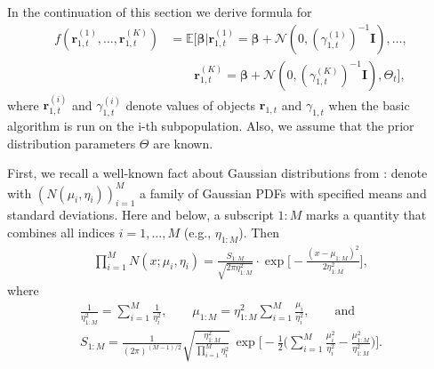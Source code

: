 In the continuation of this section we derive formula for 
\begin{equation}
\label{new_denoiser}
\begin{split}
f(\textbf{r}_{1,t}^{(1)}, \dots, \textbf{r}_{1,t}^{(K)}) & = \mathbb{E}[\bm{\beta} | \bm{r}_{1,t}^{(1)} = \bm{\beta} + \mathcal{N}(0, (\gamma_{1,t}^{(1)})^{-1}\bm{I}), \dots, \\
& \qquad \bm{r}_{1,t}^{(K)} = \bm{\beta} + \mathcal{N}(0, (\gamma_{1,t}^{(K)})^{-1}\bm{I}), \Theta_{t}],
\end{split}
\end{equation}
where $\bm{r}_{1,t}^{(i)}$ and $\gamma_{1,t}^{(i)}$ denote values of objects $\bm{r}_{1,t}$ and $\gamma_{1,t}$ when the basic algorithm is run on the i-th subpopulation. Also, we assume that the prior distribution parameters $\Theta$ are known.

First, we recall a well-known fact about Gaussian distributions from \cite{bromiley_products_2013}: denote with $(N(\mu_i, \eta_i))_{i=1}^M$ a family of Gaussian PDFs with specified means and standard deviations. Here and below, a subscript $1{:}M$ marks a quantity that combines all indices $i=1,\dots,M$ (e.g., $\eta_{1:M}$). Then
\begin{align}
    \label{prod_gaussians_PDFs}
    \prod_{i=1}^M N(x;\mu_i, \eta_i) = \frac{S_{1:M}}{\sqrt{2 \pi \eta^2_{1:M}}} \cdot \exp \bigg [ - \frac{(x-\mu_{1:M})^2}{2 \eta_{1:M}^2}\bigg ],
\end{align}
where 
\begin{gather}
    \frac{1}{\eta^2_{1:M}} = \sum_{i=1}^M \frac{1}{\eta^2_i}, \qquad \mu_{1:M} = \eta^2_{1:M} \sum_{i=1}^M \frac{\mu_i}{\eta_i^2}, \qquad \text{and} \nonumber \\
    S_{1:M} = \frac{1}{(2\pi)^{(M-1)/2}} \sqrt{\frac{\eta^2_{1:M}}{\prod_{i=1}^M \eta_i^2}} \, \exp \bigg [ -\frac{1}{2} \bigg ( \sum_{i=1}^M \frac{\mu_i^2}{\eta_i^2} - \frac{\mu^2_{1:M}}{\eta^2_{1:M}} \bigg ) \bigg ].
\end{gather}


